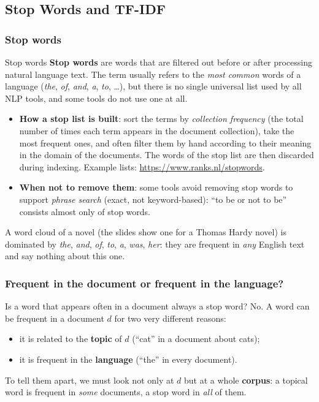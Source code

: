 \subsection{Stop Words and TF-IDF}
\label{sec:stop-words-tfidf}

\subsubsection{Stop words}

\begin{nbdef}{Stop words}
\textbf{Stop words} are words that are filtered out before or after processing natural
language text. The term usually refers to the \emph{most common} words of a language
(\emph{the}, \emph{of}, \emph{and}, \emph{a}, \emph{to}, \ldots), but there is no single
universal list used by all NLP tools, and some tools do not use one at all.
\end{nbdef}

\begin{itemize}[nosep]
  \item \textbf{How a stop list is built}: sort the terms by \emph{collection frequency}
        (the total number of times each term appears in the document collection), take
        the most frequent ones, and often filter them by hand according to their meaning
        in the domain of the documents. The words of the stop list are then discarded
        during indexing. Example lists: \url{https://www.ranks.nl/stopwords}.
  \item \textbf{When not to remove them}: some tools avoid removing stop words to
        support \emph{phrase search} (exact, not keyword-based): ``to be or not to be''
        consists almost only of stop words.
\end{itemize}

A word cloud of a novel (the slides show one for a Thomas Hardy novel) is dominated by
\emph{the}, \emph{and}, \emph{of}, \emph{to}, \emph{a}, \emph{was}, \emph{her}: they are
frequent in \emph{any} English text and say nothing about this one.

\subsubsection{Frequent in the document or frequent in the language?}

\begin{nbintuition}
Is a word that appears often in a document always a stop word? No. A word can be
frequent in a document $d$ for two very different reasons:
\begin{itemize}[nosep]
  \item it is related to the \textbf{topic} of $d$ (``cat'' in a document about cats);
  \item it is frequent in the \textbf{language} (``the'' in every document).
\end{itemize}
To tell them apart, we must look not only at $d$ but at a whole \textbf{corpus}: a
topical word is frequent in \emph{some} documents, a stop word in \emph{all} of them.
\end{nbintuition}

